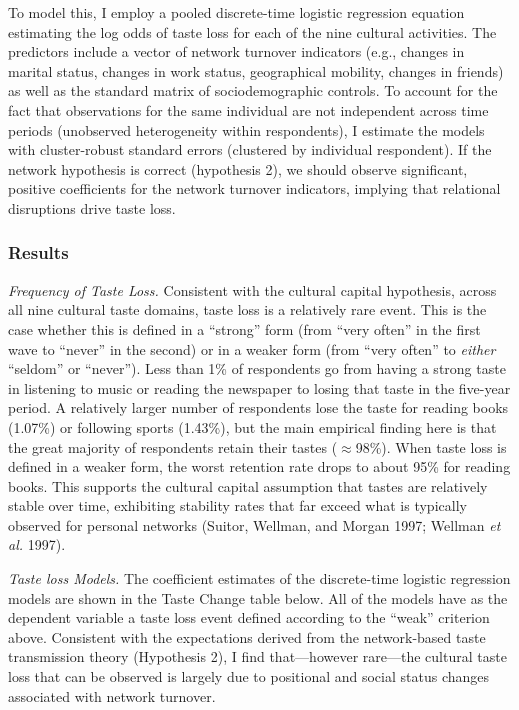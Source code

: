\documentclass[
]{article}
\begin{document}
To model this, I employ a pooled discrete-time logistic regression equation estimating the log odds of taste loss for each of the nine cultural activities. The predictors include a vector of network turnover indicators (e.g., changes in marital status, changes in work status, geographical mobility, changes in friends) as well as the standard matrix of sociodemographic controls. To account for the fact that observations for the same individual are not independent across time periods (unobserved heterogeneity within respondents), I estimate the models with cluster-robust standard errors (clustered by individual respondent). If the network hypothesis is correct (hypothesis 2), we should observe significant, positive coefficients for the network turnover indicators, implying that relational disruptions drive taste loss.

\subsubsection{Results}\label{results}

\emph{Frequency of Taste Loss.} Consistent with the cultural capital hypothesis, across all nine cultural taste domains, taste loss is a relatively rare event. This is the case whether this is defined in a ``strong'' form (from ``very often'' in the first wave to ``never'' in the second) or in a weaker form (from ``very often'' to \emph{either} ``seldom'' or ``never''). Less than 1\% of respondents go from having a strong taste in listening to music or reading the newspaper to losing that taste in the five-year period. A relatively larger number of respondents lose the taste for reading books (1.07\%) or following sports (1.43\%), but the main empirical finding here is that the great majority of respondents retain their tastes ($\approx$98\%). When taste loss is defined in a weaker form, the worst retention rate drops to about 95\% for reading books. This supports the cultural capital assumption that tastes are relatively stable over time, exhibiting stability rates that far exceed what is typically observed for personal networks (Suitor, Wellman, and Morgan 1997; Wellman \emph{et al.} 1997).

\emph{Taste loss Models.} The coefficient estimates of the discrete-time logistic regression models are shown in the Taste Change table below. All of the models have as the dependent variable a taste loss event defined according to the ``weak'' criterion above. Consistent with the expectations derived from the network-based taste transmission theory (Hypothesis 2), I find that---however rare---the cultural taste loss that can be observed is largely due to positional and social status changes associated with network turnover. 
\end{document}
